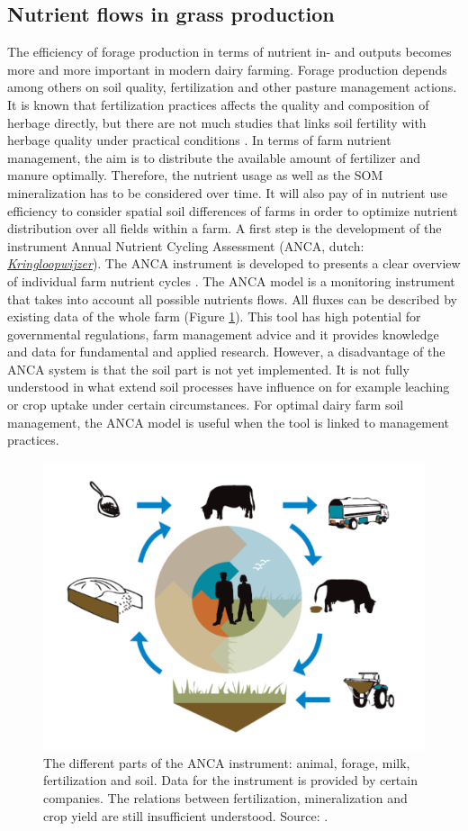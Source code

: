 \documentclass[10pt,twoside,dutch,english]{report}
\begin{document}
		\subsection{Nutrient flows in grass production}
		The efficiency of forage production in terms of nutrient in- and outputs becomes more and more important in modern dairy farming. Forage production depends among others on soil quality, fertilization and other pasture management actions. It is known that fertilization practices affects the quality and composition of herbage directly, but there are not much studies that links soil fertility with herbage quality under practical conditions \citep{Reijneveld2014}. In terms of farm nutrient management, the aim is to  distribute the available amount of fertilizer and manure optimally. Therefore, the nutrient usage as well as the SOM mineralization has to be considered over time. It will also pay of in nutrient use efficiency to consider spatial soil differences of farms in order to optimize nutrient  distribution over all fields within a farm.  A first step is the development of the instrument Annual Nutrient Cycling Assessment (ANCA, dutch: 	\href{http://www.wageningenur.nl/nl/show/KringloopWijzer-2.htm}{\textit{Kringloopwijzer}}). The ANCA instrument is developed to presents a clear overview of individual farm nutrient cycles \citep{Aarts2013}. The ANCA model is a monitoring instrument that takes into account all possible nutrients flows. All fluxes can be described by existing data of the whole farm (Figure \ref{fig:KLW}). This tool has high potential for governmental regulations, farm management advice and it provides knowledge and data for fundamental and applied research. However, a disadvantage of the ANCA system is that the soil part is not yet implemented. It is not fully understood in what extend soil processes have influence on for example leaching or crop uptake under certain circumstances.  For optimal dairy farm soil management, the ANCA model is useful when the tool is linked to management practices. 
        
      		\begin{figure}[ht]
			\centering
			\includegraphics[width=0.6\linewidth]{intro_KLW}
			\caption{The different parts of the ANCA instrument: animal, forage, milk, fertilization and soil. Data for the instrument is provided by certain companies. The relations between fertilization, mineralization and crop yield are still insufficient understood. Source: \citet{Holster2013}. }
			\label{fig:KLW}
		\end{figure}
		
\end{document}
